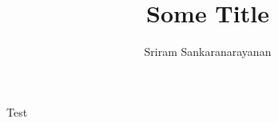 \documentclass[one column,a4paper]{article}
\title{\Huge Some Title}
\author[1]{Sriram Sankaranarayanan}
\affil[1]{Department of Mathematics and Industrial Engineering, Polytechnique Montr\'{e}al}
\date{}
\begin{document}
\maketitle

Test
% 
% 
\end{document}
